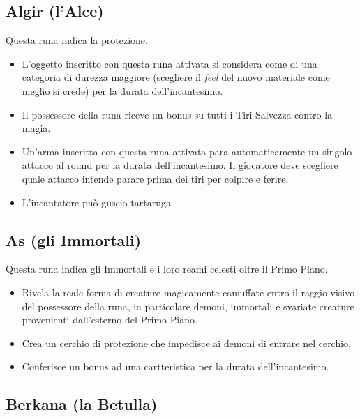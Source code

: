 \documentclass[10pt,a4paper]{article}
\begin{document}
 
 
\subsection*{Algir (l'Alce)} 
Questa runa indica la protezione.
 \begin{itemize}
\item       L'oggetto inscritto con questa runa attivata si considera come di una categoria di durezza maggiore (scegliere il \textit{feel} del nuovo materiale come meglio si crede) per la durata dell'incantesimo.
 
\item       Il possessore della runa riceve un bonus su tutti i Tiri Salvezza contro la magia.
 
\item       Un'arma inscritta con questa runa attivata para automaticamente un singolo attacco al round per la durata dell'incantesimo.
 Il giocatore deve scegliere quale attacco intende parare prima dei tiri per colpire e ferire.
 
\item		L'incantatore pu\`{o} guscio tartaruga
 \end{itemize}
 
 
 
\subsection*{As (gli Immortali)}
 
Questa runa indica gli Immortali e i loro reami celesti oltre il Primo Piano.
  \begin{itemize}
\item       Rivela la reale forma di creature magicamente camuffate entro il raggio visivo del possessore della runa, in particolare demoni, immortali e svariate creature provenienti dall'esterno del Primo Piano.
 
\item       Crea un cerchio di protezione che impedisce ai demoni di entrare nel cerchio.
 
\item       Conferisce un bonus ad una cartteristica per la durata dell'incantesimo.
 \end{itemize}
 
 
\subsection*{Berkana (la Betulla)}
 
\end{document}

